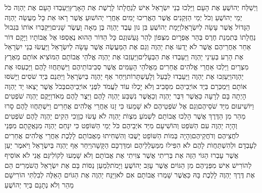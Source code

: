 \documentclass[../main/main.tex]{subfiles}
\begin{document}
\begin{multicols*}{\ncols}
וַיְשַׁלַּח יְהוֹשֻׁעַ אֶת הָעָם וַיֵּלְכוּ בְנֵי יִשְׂרָאֵל אִישׁ לְנַחֲלָתוֹ לָרֶשֶׁת אֶת הָאָרֶץ\PreVerseSpace{}וַיַּעַבְדוּ הָעָם אֶת יַהְוֶה כֹּל יְמֵי יְהוֹשֻׁעַ וְכֹל יְמֵי הַזְּקֵנִים אֲשֶׁר הֶאֱרִיכוּ יָמִים אַחֲרֵי יְהוֹשׁוּעַ אֲשֶׁר רָאוּ אֵת כָּל מַעֲשֵׂה יַהְוֶה הַגָּדוֹל אֲשֶׁר עָשָׂה לְיִשְׂרָאֵל\PreVerseSpace{}וַיָּמָת יְהוֹשֻׁעַ בִּן נוּן עֶבֶד יַהְוֶה בֶּן מֵאָה וָעֶשֶׂר שָׁנִים\PreVerseSpace{}וַיִּקְבְּרוּ אוֹתוֹ בִּגְבוּל נַחֲלָתוֹ בְּתִמְנַת חֶרֶס בְּהַר אֶפְרָיִם מִצְּפוֹן לְהַר גָּעַשׁ\PreVerseSpace{}וְגַם כָּל הַדּוֹר הַהוּא נֶאֶסְפוּ אֶל אֲבוֹתָיו וַיָּקָם דּוֹר אַחֵר אַחֲרֵיהֶם אֲשֶׁר לֹא יָדְעוּ אֶת יַהְוֶה וְגַם אֶת הַמַּעֲשֶׂה אֲשֶׁר עָשָׂה לְיִשְׂרָאֵל \ClosedSection{}וַיַּעֲשׂוּ בְנֵי יִשְׂרָאֵל אֶת הָרַע בְּעֵינֵי יַהְוֶה וַיַּעַבְדוּ אֶת הַבְּעָלִים\PreVerseSpace{}וַיַּעַזְבוּ אֶת יַהְוֶה אֱלֹהֵי אֲבוֹתָם הַמּוֹצִיא אוֹתָם מֵאֶרֶץ מִצְרַיִם וַיֵּלְכוּ אַחֲרֵי אֱלֹהִים אֲחֵרִים מֵאֱלֹהֵי הָעַמִּים אֲשֶׁר סְבִיבוֹתֵיהֶם וַיִּשְׁתַּחֲווּ לָהֶם וַיַּכְעִסוּ אֶת יַהְוֶה\PreVerseSpace{}וַיַּעַזְבוּ אֶת יַהְוֶה וַיַּעַבְדוּ לַבַּעַל וְלָעַשְׁתָּרוֹת\PreVerseSpace{}וַיִּחַר אַף יַהְוֶה בְּיִשְׂרָאֵל וַיִּתְּנֵם בְּיַד שֹׁסִים וַיָּשֹׁסּוּ אוֹתָם וַיִּמְכְּרֵם בְּיַד אוֹיְבֵיהֶם מִסָּבִיב וְלֹא יָכְלוּ עוֹד לַעֲמֹד לִפְנֵי אוֹיְבֵיהֶם\PreVerseSpace{}בְּכֹל אֲשֶׁר יָצְאוּ יַד יַהְוֶה הָיְתָה בָּם לְרָעָה כַּאֲשֶׁר דִּבֶּר יַהְוֶה וְכַאֲשֶׁר נִשְׁבַּע יַהְוֶה לָהֶם וַיֵּצֶר לָהֶם מְאֹד\PreVerseSpace{}וַיָּקֶם יַהְוֶה שֹׁפְטִים וַיּוֹשִׁיעוּם מִיַּד שֹׁסֵיהֶם\PreVerseSpace{}וְגַם אֶל שֹׁפְטֵיהֶם לֹא שָׁמֵעוּ כִּי זָנוּ אַחֲרֵי אֱלֹהִים אֲחֵרִים וַיִּשְׁתַּחֲווּ לָהֶם סָרוּ מַהֵר מִן הַדֶּרֶךְ אֲשֶׁר הָלְכוּ אֲבוֹתָם לִשְׁמֹעַ מִצְוֺת יַהְוֶה לֹא עָשׂוּ כֵן\PreVerseSpace{}וְכִי הֵקִים יַהְוֶה לָהֶם שֹׁפְטִים וְהָיָה יַהְוֶה עִם הַשֹּׁפֵט וְהוֹשִׁיעָם מִיַּד אֹיְבֵיהֶם כֹּל יְמֵי הַשּׁוֹפֵט כִּי יִנָּחֵם יַהְוֶה מִנַּאֲקָתָם מִפְּנֵי לֹחֲצֵיהֶם וְדֹחֲקֵיהֶם\PreVerseSpace{}וְהָיָה בְּמוֹת הַשּׁוֹפֵט יָשֻׁבוּ וְהִשְׁחִיתוּ מֵאֲבוֹתָם לָלֶכֶת אַחֲרֵי אֱלֹהִים אֲחֵרִים לְעָבְדָם וּלְהִשְׁתַּחֲוֺת לָהֶם לֹא הִפִּילוּ מִמַּעַלְלֵיהֶם וּמִדַּרְכָּם הַקָּשָׁה\PreVerseSpace{}וַיִּחַר אַף יַהְוֶה בְּיִשְׂרָאֵל וַיֹּאמֶר יַעַן אֲשֶׁר עָבְרוּ הַגּוֹי הַזֶּה אֶת בְּרִיתִי אֲשֶׁר צִוִּיתִי אֶת אֲבוֹתָם וְלֹא שָׁמְעוּ לְקוֹלִי\PreVerseSpace{}גַּם אֲנִי לֹא אוֹסִיף לְהוֹרִישׁ אִישׁ מִפְּנֵיהֶם מִן הַגּוֹיִם אֲשֶׁר עָזַב יְהוֹשֻׁעַ וַיָּמֹת\PreVerseSpace{}לְמַעַן נַסּוֹת בָּם אֶת יִשְׂרָאֵל הֲשֹׁמְרִים הֵם אֶת דֶּרֶךְ יַהְוֶה לָלֶכֶת בָּהּ\SubEnd{} כַּאֲשֶׁר שָׁמְרוּ אֲבוֹתָם אִם לֹא\PreVerseSpace{}וַיַּנַּח יַהְוֶה אֶת הַגּוֹיִם הָאֵלֶּה לְבִלְתִּי הוֹרִישָׁם מַהֵר וְלֹא נְתָנָם בְּיַד יְהוֹשֻׁעַ\OpenSection{}\par

\end{multicols*}
\end{document}
